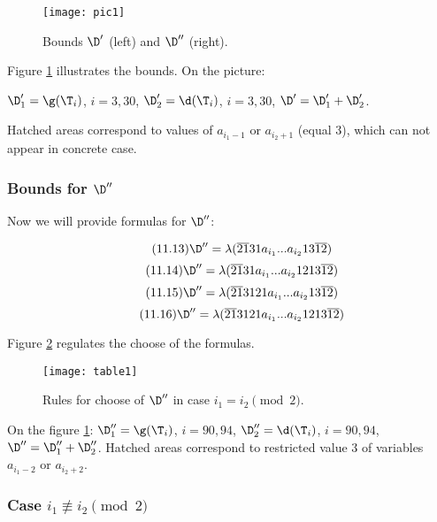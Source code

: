 \begin{figure}[p]
	\centering
	\texttt{[image: pic1]}
	\caption{Bounds $\D'$ (left) and $\D''$ (right).}
	\label{pic1}
\end{figure}

Figure \ref{pic1} illustrates the bounds. On the picture:

$\D_1' = \g(\T_i)$, $i=3,30$,
$\D_2' = \d  (\T_i)$, $i=3,30$,
$\D' = \D_1' + \D_2'$.

Hatched areas correspond to values of $a_{i_1 - 1}$ or $a_{i_2 + 1}$ (equal 3),
which can not appear in concrete case.

\subsubsection{Bounds for $\D''$}
Now we will provide formulas for $\D''$:

\begin{equation}\tag{11.13}
	\D'' = \lambda(\overline{21}31a_{i_1}... a_{i_2}13\overline{12})
\end{equation}
\begin{equation}\tag{11.14}
	\D'' = \lambda(\overline{21}31a_{i_1}... a_{i_2}1213\overline{12})
\end{equation}
\begin{equation}\tag{11.15}
	\D'' = \lambda(\overline{21}3121a_{i_1}... a_{i_2}13\overline{12})
\end{equation}
\begin{equation}\tag{11.16}
	\D'' = \lambda(\overline{21}3121a_{i_1}... a_{i_2}1213\overline{12})
\end{equation}

Figure \ref{table1} regulates the choose of the formulas.

\begin{figure}[ht]
	\centering
	\texttt{[image: table1]}
	\caption{Rules for choose of $\D''$ in case $i_1 = i_2 \pmod 2$.}
	\label{table1}
\end{figure}

On the figure \ref{pic1}:
$\D_1'' = \g(\T_i)$, $i = 90, 94$,
$\D_2'' = \d  (\T_i)$, $i = 90, 94$,
$\D'' = \D_1'' + \D_2''$.
Hatched areas correspond to restricted value 3 of variables
$a_{i_1 - 2}$ or $a_{i_2 + 2}$.

\subsubsection{Case $i_1 \not\equiv i_2 \pmod 2$}

